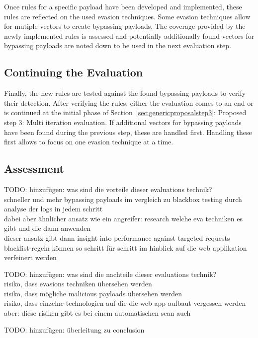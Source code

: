 Once rules for a specific payload have been developed and implemented, these rules are reflected on the used evasion techniques. Some evasion techniques allow for mutiple vectors to create bypassing payloads. The coverage provided by the newly implemented rules is assessed and potentially additionally found vectors for bypassing payloads are noted down to be used in the next evaluation step. 
\subsection{Continuing the Evaluation}
Finally, the new rules are tested against the found bypassing payloads to verify their detection. After verifying the rules, either the evaluation comes to an end or is continued at the initial phase of Section~\ref{sec:genericproposalstep3}: Proposed step 3: Multi iteration evaluation. If additional vectors for bypassing payloads have been found during the previous step, these are handled first. Handling these first allows to focus on one evasion technique at a time.

\subsection{Assessment}

{\color{red} TODO: hinzufügen: was sind die vorteile dieser evaluations technik?  \\
schneller und mehr bypassing payloads im vergleich zu blackbox testing durch analyse der logs in jedem schritt \\
dabei aber ähnlicher ansatz wie ein angreifer: research welche eva techniken es gibt und die dann anwenden \\
dieser ansatz gibt dann insight into performance against targeted requests \\
blacklist-regeln können so schritt für schritt im hinblick auf die web applikation verfeinert werden \\
}


{\color{red} TODO: hinzufügen: was sind die nachteile dieser evaluations technik? \\
risiko, dass evasions techniken übersehen werden \\
risiko, dass mögliche malicious payloads übersehen werden \\
risiko, dass einzelne technologien auf die die web app aufbaut vergessen werden \\
aber: diese risiken gibt es bei einem automatischen scan auch \\
}

{\color{red} TODO: hinzufügen: überleitung zu conclusion }
